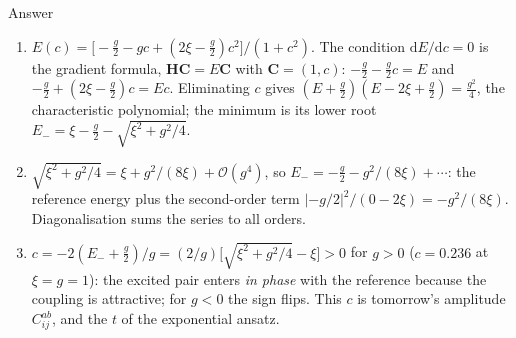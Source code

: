 \documentclass[aspectratio=169,10pt]{beamer}
\newcounter{thinkctr}
\newcommand{\thinka}[1]{%
  \begin{tcolorbox}[colback=paleteal,colframe=teal,title={\bfseries Answer to pause \#\thethinkctr}]
  #1
  \end{tcolorbox}}
\newcommand{\dd}{\mathrm{d}}
\begin{document}
\begin{frame}{Answer}
  \thinka{
  \begin{enumerate}
    \item $E(c)=\bigl[-\tfrac g2-gc+(2\xi-\tfrac g2)c^2\bigr]/(1+c^2)$. The condition $\dd E/\dd c=0$ is the gradient formula, $\bm{H}\bm{C}=E\bm{C}$ with $\bm{C}=(1,c)$: $-\tfrac g2-\tfrac g2c=E$ and $-\tfrac g2+(2\xi-\tfrac g2)c=Ec$. Eliminating $c$ gives $(E+\tfrac g2)(E-2\xi+\tfrac g2)=\tfrac{g^2}{4}$, the characteristic polynomial; the minimum is its lower root $E_-=\xi-\tfrac g2-\sqrt{\xi^2+g^2/4}$.
    \item $\sqrt{\xi^2+g^2/4}=\xi+g^2/(8\xi)+\mathcal{O}(g^4)$, so $E_-=-\tfrac g2-g^2/(8\xi)+\cdots$: the reference energy plus the second-order term $|{-g/2}|^2/(0-2\xi)=-g^2/(8\xi)$. Diagonalisation sums the series to all orders.
    \item $c=-2(E_-+\tfrac g2)/g=(2/g)\bigl[\sqrt{\xi^2+g^2/4}-\xi\bigr]>0$ for $g>0$ ($c=0.236$ at $\xi=g=1$): the excited pair enters \emph{in phase} with the reference because the coupling is attractive; for $g<0$ the sign flips. This $c$ is tomorrow's amplitude $C_{ij}^{ab}$, and the $t$ of the exponential ansatz.
  \end{enumerate}}
\end{frame}
\end{document}

